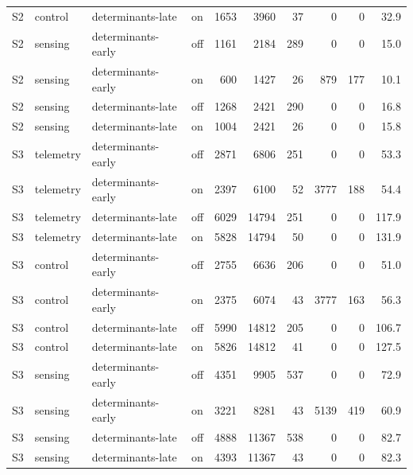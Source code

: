 \documentclass[preprint,11pt,3p]{elsarticle}
\begin{document}
\begin{table}[!htbp]
\begin{tabular}{llllrrrrrr}
S2 & control & determinants-late & on & 1653 & 3960 & 37 & 0 & 0 & 32.9 \\
S2 & sensing & determinants-early & off & 1161 & 2184 & 289 & 0 & 0 & 15.0 \\
S2 & sensing & determinants-early & on & 600 & 1427 & 26 & 879 & 177 & 10.1 \\
S2 & sensing & determinants-late & off & 1268 & 2421 & 290 & 0 & 0 & 16.8 \\
S2 & sensing & determinants-late & on & 1004 & 2421 & 26 & 0 & 0 & 15.8 \\
S3 & telemetry & determinants-early & off & 2871 & 6806 & 251 & 0 & 0 & 53.3 \\
S3 & telemetry & determinants-early & on & 2397 & 6100 & 52 & 3777 & 188 & 54.4 \\
S3 & telemetry & determinants-late & off & 6029 & 14794 & 251 & 0 & 0 & 117.9 \\
S3 & telemetry & determinants-late & on & 5828 & 14794 & 50 & 0 & 0 & 131.9 \\
S3 & control & determinants-early & off & 2755 & 6636 & 206 & 0 & 0 & 51.0 \\
S3 & control & determinants-early & on & 2375 & 6074 & 43 & 3777 & 163 & 56.3 \\
S3 & control & determinants-late & off & 5990 & 14812 & 205 & 0 & 0 & 106.7 \\
S3 & control & determinants-late & on & 5826 & 14812 & 41 & 0 & 0 & 127.5 \\
S3 & sensing & determinants-early & off & 4351 & 9905 & 537 & 0 & 0 & 72.9 \\
S3 & sensing & determinants-early & on & 3221 & 8281 & 43 & 5139 & 419 & 60.9 \\
S3 & sensing & determinants-late & off & 4888 & 11367 & 538 & 0 & 0 & 82.7 \\
S3 & sensing & determinants-late & on & 4393 & 11367 & 43 & 0 & 0 & 82.3 \\
\bottomrule
\end{tabular}
\end{table}
\end{document}

